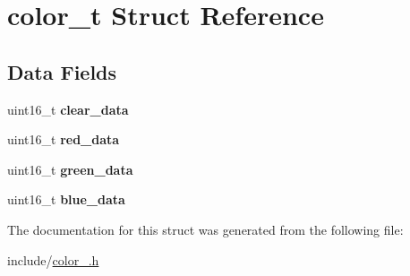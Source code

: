 \hypertarget{structcolor__t}{}\section{color\+\_\+t Struct Reference}
\label{structcolor__t}
\subsection*{Data Fields}
\begin{DoxyCompactItemize}
\item 
\hypertarget{structcolor__t_ab1323ac5327fc34e299ecdf3dcca10d7}{}uint16\+\_\+t {\bfseries clear\+\_\+data}\label{structcolor__t_ab1323ac5327fc34e299ecdf3dcca10d7}

\item 
\hypertarget{structcolor__t_a393f1816b54df2decb83fd6cfb173d0e}{}uint16\+\_\+t {\bfseries red\+\_\+data}\label{structcolor__t_a393f1816b54df2decb83fd6cfb173d0e}

\item 
\hypertarget{structcolor__t_a619a33c164a8a1e841ce4814224b2be6}{}uint16\+\_\+t {\bfseries green\+\_\+data}\label{structcolor__t_a619a33c164a8a1e841ce4814224b2be6}

\item 
\hypertarget{structcolor__t_a3f4632d2168dc2858458904693bb23c0}{}uint16\+\_\+t {\bfseries blue\+\_\+data}\label{structcolor__t_a3f4632d2168dc2858458904693bb23c0}

\end{DoxyCompactItemize}


The documentation for this struct was generated from the following file\+:\begin{DoxyCompactItemize}
\item 
include/\hyperlink{color__3_8h}{color\+\_.\+h}\end{DoxyCompactItemize}
